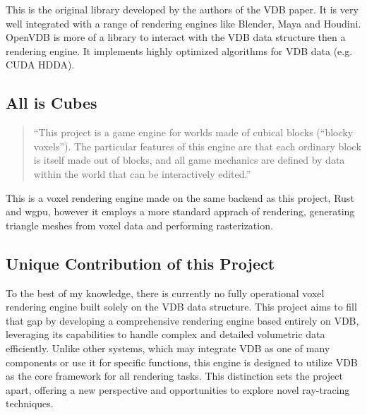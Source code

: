 This is the original library developed by the authors of the VDB paper. It is very well integrated with a range of rendering engines like Blender, Maya and Houdini. OpenVDB is more of a library to interact with the VDB data structure then a rendering engine. It implements highly optimized algorithms for VDB data (e.g. CUDA HDDA).

\subsection{All is Cubes\supercite{cubes}}

\begin{quote}
``This project is a game engine for worlds made of cubical blocks (“blocky voxels”). The particular features of this engine are that each ordinary block is itself made out of blocks, and all game mechanics are defined by data within the world that can be interactively edited.''
\end{quote}

This is a voxel rendering engine made on the same backend as this project, Rust and wgpu, however it employs a more standard apprach of rendering, generating triangle meshes from voxel data and performing rasterization.

\subsection{ Unique Contribution of this Project}
To the best of my knowledge, there is currently no fully operational voxel rendering engine built solely on the VDB data structure. This project aims to fill that gap by developing a comprehensive rendering engine based entirely on VDB, leveraging its capabilities to handle complex and detailed volumetric data efficiently. Unlike other systems, which may integrate VDB as one of many components or use it for specific functions, this engine is designed to utilize VDB as the core framework for all rendering tasks. This distinction sets the project apart, offering a new perspective and opportunities to explore novel ray-tracing techniques.
